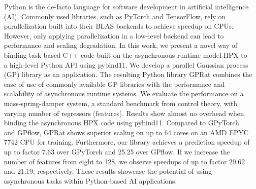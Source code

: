 Python is the de-facto language for software development in artificial intelligence (AI).
Commonly used libraries, such as PyTorch and TensorFlow, rely on parallelization built into their BLAS backends to achieve speedup on CPUs.
However, only applying parallelization in a low-level backend can lead to performance and scaling degradation.
In this work, we present a novel way of binding task-based C++ code built on the asynchronous runtime model HPX to a high-level Python API using pybind11.
We develop a parallel Gaussian process (GP) library as an application.
The resulting Python library GPRat combines the ease of use of commonly available GP libraries with the performance and scalability of asynchronous runtime systems.
We evaluate the performance on a mass-spring-damper system, a standard benchmark from control theory, with varying number of regressors (features). Results show almost no overhead when binding the asynchronous HPX code using pybind11.
Compared to GPyTorch and GPflow, GPRat shows superior scaling on up to 64 cores on an AMD EPYC 7742 CPU for training.
Furthermore, our library achieves a prediction speedup of up to factor 7.63 over GPyTorch and 25.25 over GPflow.
If we increase the number of features from eight to 128, we observe speedups of up to factor 29.62 and 21.19, respectively.
These results showcase the potential of using asynchronous tasks within Python-based AI applications.

